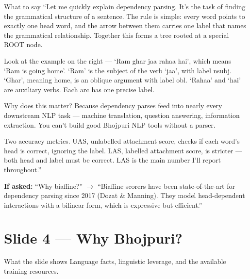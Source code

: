 \documentclass[11pt]{article}
\begin{document}
\begin{pitchbox}{What to say}
``Let me quickly explain dependency parsing. It's the task of finding the grammatical structure of a sentence. The rule is simple: every word points to exactly one head word, and the arrow between them carries one label that names the grammatical relationship. Together this forms a tree rooted at a special ROOT node.

Look at the example on the right --- `Ram ghar jaa rahaa hai', which means `Ram is going home'. `Ram' is the subject of the verb `jaa', with label nsubj. `Ghar', meaning home, is an oblique argument with label obl. `Rahaa' and `hai' are auxiliary verbs. Each arc has one precise label.

Why does this matter? Because dependency parses feed into nearly every downstream NLP task --- machine translation, question answering, information extraction. You can't build good Bhojpuri NLP tools without a parser.

Two accuracy metrics. UAS, unlabelled attachment score, checks if each word's head is correct, ignoring the label. LAS, labelled attachment score, is stricter --- both head and label must be correct. LAS is the main number I'll report throughout.''
\end{pitchbox}

\begin{tipbox}
\textbf{If asked:} ``Why biaffine?'' $\to$ ``Biaffine scorers have been state-of-the-art for dependency parsing since 2017 (Dozat \& Manning). They model head-dependent interactions with a bilinear form, which is expressive but efficient.''
\end{tipbox}

\section{Slide 4 --- Why Bhojpuri?}

\begin{pitchbox}{What the slide shows}
Language facts, linguistic leverage, and the available training resources.
\end{pitchbox}
\end{document}
